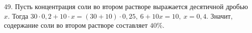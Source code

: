 49. Пусть концентрация соли во втором растворе выражается десятичной дробью $x.$ Тогда $30\cdot0,2+10\cdot x=(30+10)\cdot0,25,\ 6+10x=10,\ x=0,4.$ Значит, содержание соли во втором растворе составляет $40\%.$\\
